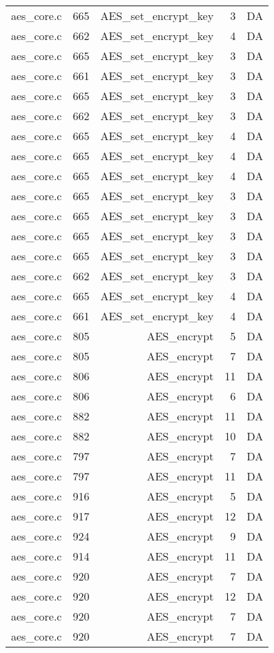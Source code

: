 \begin{table}
\begin{tabular}{clrrr}
aes\_core.c& 665&AES\_set\_encrypt\_key&3 &DA\\
aes\_core.c& 662&AES\_set\_encrypt\_key&4 &DA\\
aes\_core.c& 665&AES\_set\_encrypt\_key&3 &DA\\
aes\_core.c& 661&AES\_set\_encrypt\_key&3 &DA\\
aes\_core.c& 665&AES\_set\_encrypt\_key&3 &DA\\
aes\_core.c& 662&AES\_set\_encrypt\_key&3 &DA\\
aes\_core.c& 665&AES\_set\_encrypt\_key&4 &DA\\
aes\_core.c& 665&AES\_set\_encrypt\_key&4 &DA\\
aes\_core.c& 665&AES\_set\_encrypt\_key&4 &DA\\
aes\_core.c& 665&AES\_set\_encrypt\_key&3 &DA\\
aes\_core.c& 665&AES\_set\_encrypt\_key&3 &DA\\
aes\_core.c& 665&AES\_set\_encrypt\_key&3 &DA\\
aes\_core.c& 665&AES\_set\_encrypt\_key&3 &DA\\
aes\_core.c& 662&AES\_set\_encrypt\_key&3 &DA\\
aes\_core.c& 665&AES\_set\_encrypt\_key&4 &DA\\
aes\_core.c& 661&AES\_set\_encrypt\_key&4 &DA\\
aes\_core.c& 805&AES\_encrypt&5 &DA\\
aes\_core.c& 805&AES\_encrypt&7 &DA\\
aes\_core.c& 806&AES\_encrypt&11&DA\\
aes\_core.c& 806&AES\_encrypt&6 &DA\\
aes\_core.c& 882&AES\_encrypt&11&DA\\
aes\_core.c& 882&AES\_encrypt&10&DA\\
aes\_core.c& 797&AES\_encrypt&7 &DA\\
aes\_core.c& 797&AES\_encrypt&11&DA\\
aes\_core.c& 916&AES\_encrypt&5 &DA\\
aes\_core.c& 917&AES\_encrypt&12&DA\\
aes\_core.c& 924&AES\_encrypt&9 &DA\\
aes\_core.c& 914&AES\_encrypt&11&DA\\
aes\_core.c& 920&AES\_encrypt&7 &DA\\
aes\_core.c& 920&AES\_encrypt&12&DA\\
aes\_core.c& 920&AES\_encrypt&7 &DA\\
aes\_core.c& 920&AES\_encrypt&7 &DA\\

\end{tabular}
\end{table}
